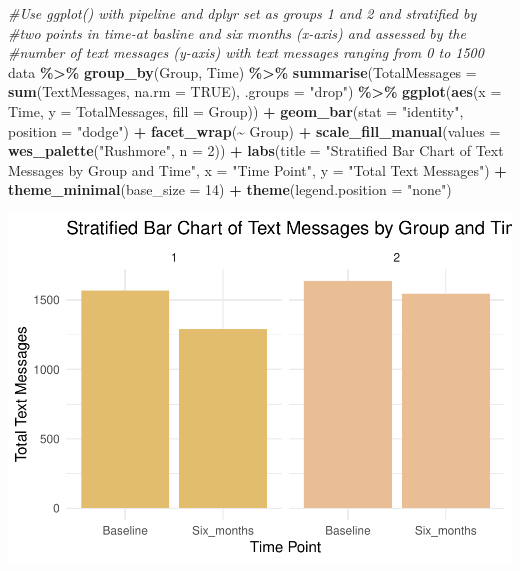 \documentclass[
]{article}
\newenvironment{Shaded}{\begin{snugshade}}{\end{snugshade}}
\newcommand{\AttributeTok}[1]{\textcolor[rgb]{0.13,0.29,0.53}{#1}}
\newcommand{\CommentTok}[1]{\textcolor[rgb]{0.56,0.35,0.01}{\textit{#1}}}
\newcommand{\ConstantTok}[1]{\textcolor[rgb]{0.56,0.35,0.01}{#1}}
\newcommand{\DecValTok}[1]{\textcolor[rgb]{0.00,0.00,0.81}{#1}}
\newcommand{\FunctionTok}[1]{\textcolor[rgb]{0.13,0.29,0.53}{\textbf{#1}}}
\newcommand{\NormalTok}[1]{#1}
\newcommand{\SpecialCharTok}[1]{\textcolor[rgb]{0.81,0.36,0.00}{\textbf{#1}}}
\newcommand{\StringTok}[1]{\textcolor[rgb]{0.31,0.60,0.02}{#1}}
\begin{document}
\begin{Shaded}
\begin{Highlighting}[]
\CommentTok{\#Use ggplot() with pipeline and dplyr set as groups 1 and 2 and stratified by }
\CommentTok{\#two points in time{-}at basline and six months (x{-}axis) and assessed by the }
\CommentTok{\#number of text messages (y{-}axis) with text messages ranging from 0 to 1500}
\NormalTok{data }\SpecialCharTok{\%\textgreater{}\%}
  \FunctionTok{group\_by}\NormalTok{(Group, Time) }\SpecialCharTok{\%\textgreater{}\%}
  \FunctionTok{summarise}\NormalTok{(}\AttributeTok{TotalMessages =} \FunctionTok{sum}\NormalTok{(TextMessages, }\AttributeTok{na.rm =} \ConstantTok{TRUE}\NormalTok{), }\AttributeTok{.groups =} \StringTok{"drop"}\NormalTok{) }\SpecialCharTok{\%\textgreater{}\%}
  \FunctionTok{ggplot}\NormalTok{(}\FunctionTok{aes}\NormalTok{(}\AttributeTok{x =}\NormalTok{ Time, }\AttributeTok{y =}\NormalTok{ TotalMessages, }\AttributeTok{fill =}\NormalTok{ Group)) }\SpecialCharTok{+}
  \FunctionTok{geom\_bar}\NormalTok{(}\AttributeTok{stat =} \StringTok{"identity"}\NormalTok{, }\AttributeTok{position =} \StringTok{"dodge"}\NormalTok{) }\SpecialCharTok{+}
  \FunctionTok{facet\_wrap}\NormalTok{(}\SpecialCharTok{\textasciitilde{}}\NormalTok{ Group) }\SpecialCharTok{+}
  \FunctionTok{scale\_fill\_manual}\NormalTok{(}\AttributeTok{values =} \FunctionTok{wes\_palette}\NormalTok{(}\StringTok{"Rushmore"}\NormalTok{, }\AttributeTok{n =} \DecValTok{2}\NormalTok{)) }\SpecialCharTok{+}
  \FunctionTok{labs}\NormalTok{(}\AttributeTok{title =} \StringTok{"Stratified Bar Chart of Text Messages by Group and Time"}\NormalTok{,}
       \AttributeTok{x =} \StringTok{"Time Point"}\NormalTok{,}
       \AttributeTok{y =} \StringTok{"Total Text Messages"}\NormalTok{) }\SpecialCharTok{+}
  \FunctionTok{theme\_minimal}\NormalTok{(}\AttributeTok{base\_size =} \DecValTok{14}\NormalTok{) }\SpecialCharTok{+}
  \FunctionTok{theme}\NormalTok{(}\AttributeTok{legend.position =} \StringTok{"none"}\NormalTok{)}
\end{Highlighting}
\end{Shaded}

\includegraphics{Assignment_3_Collaborating_in_Github_files/figure-latex/Bar Chart-1.pdf}
\end{document}
